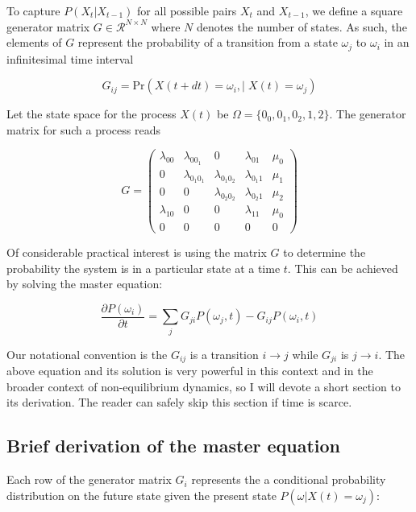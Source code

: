 \documentclass{ucetd}
\begin{document}
To capture $P(X_{t}|X_{t-1})$ for all possible pairs $X_{t}$ and $X_{t-1}$, we define a square generator matrix $G\in \mathcal{R}^{N\times N}$ where $N$ denotes the number of states. As such, the elements of $G$ represent the probability of a transition from a state $\omega_{j}$ to $\omega_{i}$ in an infinitesimal time interval

\begin{equation*}
G_{ij} = \mathrm{Pr}\left(X(t+dt)=\omega_{i}, | \;X(t)=\omega_{j}\right)
\end{equation*}

Let the state space for the process $X(t)$ be $\Omega = \{0_{0},0_{1},0_{2},1,2\}$. The generator matrix for such a process reads

\begin{equation*}
G = 
\begin{pmatrix}
\lambda_{00} & \lambda_{0 0_{1}} & 0 & \lambda_{01} & \mu_{0}\\
0 & \lambda_{0_{1}0_{1}} & \lambda_{0_{1}0_{2}} & \lambda_{0_{1}1} & \mu_{1}\\
0 & 0 & \lambda_{0_{2}0_{2}} & \lambda_{0_{2}1} & \mu_{2}\\
\lambda_{10} & 0 & 0 & \lambda_{11} & \mu_{0}\\
0 & 0 & 0 & 0 & 0
\end{pmatrix}
\end{equation*}

Of considerable practical interest is using the matrix $G$ to determine the probability the system is in a particular state at a time $t$. This can be achieved by solving the master equation:

\begin{equation*}
\frac{\partial P(\omega_{i})}{\partial t} = \sum_{j}G_{ji}P(\omega_{j},t) - G_{ij}P(\omega_{i},t)
\end{equation*}

Our notational convention is the $G_{ij}$ is a transition $i\rightarrow j$ while $G_{ji}$ is $j\rightarrow i$. The above equation and its solution is very powerful in this context and in the broader context of non-equilibrium dynamics, so I will devote a short section to its derivation. The reader can safely skip this section if time is scarce.

\subsection{Brief derivation of the master equation}

Each row of the generator matrix $G_{i}$ represents the a conditional probability distribution on the future state given the present state $P(\omega | X(t) = \omega_{j})$:
\end{document}
